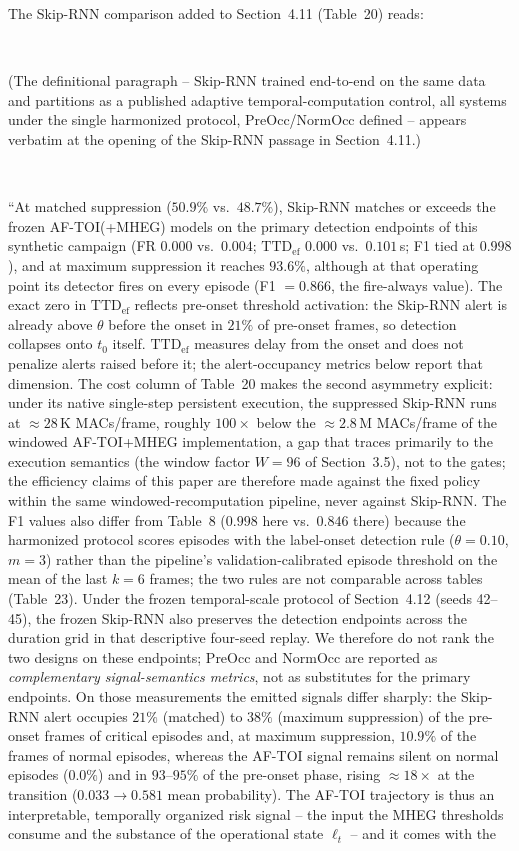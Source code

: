 \documentclass[1p,12pt,authoryear]{elsarticle}
\begin{document}
The Skip-RNN comparison added to Section~4.11 (Table~20) reads:

~

(The definitional paragraph -- Skip-RNN trained end-to-end on the same data and partitions as a published adaptive temporal-computation control, all systems under the single harmonized protocol, PreOcc/NormOcc defined -- appears verbatim at the opening of the Skip-RNN passage in Section~4.11.)

~

``At matched suppression ($50.9\%$ vs.\ $48.7\%$), Skip-RNN matches or exceeds the frozen AF-TOI(+MHEG) models on the primary detection endpoints of this synthetic campaign (FR $0.000$ vs.\ $0.004$; $\mathrm{TTD}_{\mathrm{ef}}$ $0.000$ vs.\ $0.101$\,s; F1 tied at $0.998$), and at maximum suppression it reaches $93.6\%$, although at that operating point its detector fires on every episode (F1 $=0.866$, the fire-always value). The exact zero in $\mathrm{TTD}_{\mathrm{ef}}$ reflects pre-onset threshold activation: the Skip-RNN alert is already above $\theta$ before the onset in $21\%$ of pre-onset frames, so detection collapses onto $t_0$ itself. $\mathrm{TTD}_{\mathrm{ef}}$ measures delay from the onset and does not penalize alerts raised before it; the alert-occupancy metrics below report that dimension. The cost column of Table~20 makes the second asymmetry explicit: under its native single-step persistent execution, the suppressed Skip-RNN runs at ${\approx}28$\,K MACs/frame, roughly $100\times$ below the ${\approx}2.8$\,M MACs/frame of the windowed AF-TOI+MHEG implementation, a gap that traces primarily to the execution semantics (the window factor $W{=}96$ of Section~3.5), not to the gates; the efficiency claims of this paper are therefore made against the fixed policy within the same windowed-recomputation pipeline, never against Skip-RNN. The F1 values also differ from Table~8 ($0.998$ here vs.\ $0.846$ there) because the harmonized protocol scores episodes with the label-onset detection rule ($\theta{=}0.10$, $m{=}3$) rather than the pipeline's validation-calibrated episode threshold on the mean of the last $k{=}6$ frames; the two rules are not comparable across tables (Table~23). Under the frozen temporal-scale protocol of Section~4.12 (seeds 42--45), the frozen Skip-RNN also preserves the detection endpoints across the duration grid in that descriptive four-seed replay. We therefore do not rank the two designs on these endpoints; PreOcc and NormOcc are reported as \emph{complementary signal-semantics metrics}, not as substitutes for the primary endpoints. On those measurements the emitted signals differ sharply: the Skip-RNN alert occupies $21\%$ (matched) to $38\%$ (maximum suppression) of the pre-onset frames of critical episodes and, at maximum suppression, $10.9\%$ of the frames of normal episodes, whereas the AF-TOI signal remains silent on normal episodes ($0.0\%$) and in $93$--$95\%$ of the pre-onset phase, rising ${\approx}18\times$ at the transition ($0.033 \rightarrow 0.581$ mean probability). The AF-TOI trajectory is thus an interpretable, temporally organized risk signal -- the input the MHEG thresholds consume and the substance of the operational state $\ell_t$ -- and it comes with the 
\end{document}
